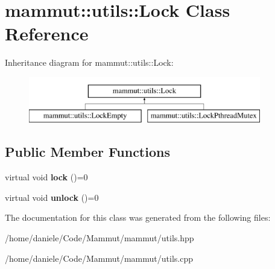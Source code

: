 \hypertarget{classmammut_1_1utils_1_1Lock}{\section{mammut\-:\-:utils\-:\-:Lock Class Reference}
\label{classmammut_1_1utils_1_1Lock}
}
Inheritance diagram for mammut\-:\-:utils\-:\-:Lock\-:\begin{figure}[H]
\begin{center}
\leavevmode
\includegraphics[height=2.000000cm]{classmammut_1_1utils_1_1Lock}
\end{center}
\end{figure}
\subsection*{Public Member Functions}
\begin{DoxyCompactItemize}
\item 
\hypertarget{classmammut_1_1utils_1_1Lock_a175578977267834347950e47fb7cbf4f}{virtual void {\bfseries lock} ()=0}\label{classmammut_1_1utils_1_1Lock_a175578977267834347950e47fb7cbf4f}

\item 
\hypertarget{classmammut_1_1utils_1_1Lock_a857cceda31f27336f227ab3b2e490467}{virtual void {\bfseries unlock} ()=0}\label{classmammut_1_1utils_1_1Lock_a857cceda31f27336f227ab3b2e490467}

\end{DoxyCompactItemize}


The documentation for this class was generated from the following files\-:\begin{DoxyCompactItemize}
\item 
/home/daniele/\-Code/\-Mammut/mammut/utils.\-hpp\item 
/home/daniele/\-Code/\-Mammut/mammut/utils.\-cpp\end{DoxyCompactItemize}
